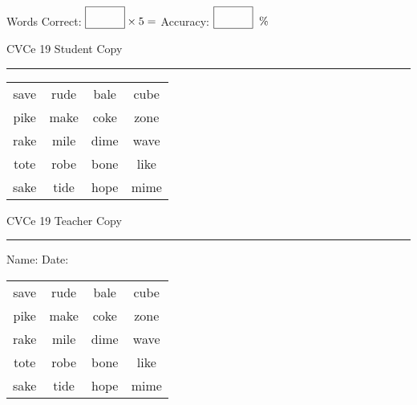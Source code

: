 \documentclass{memoir}
\begin{document}
\small

Words Correct: $\fbox{\phantom{\huge 100}} \times 5 = $ Accuracy: $\fbox{\phantom{\huge 100}}\;\; \%$ 

\vfill

\newpage


\footnotesize \noindent
CVCe 19 \hfill Student Copy
\smallskip
\hrule

\Large

\setlength{\tabcolsep}{14pt}
\def\arraystretch{2}

{\selectfont


\begin{vplace}[0.5]
\begin{center}
\begin{tabular}{cccc}
save & rude & bale & cube \\
pike & make & coke & zone \\
rake & mile & dime & wave \\
tote & robe & bone & like \\
sake & tide & hope & mime \\
\end{tabular}
\end{center}
\end{vplace}

}

\newpage

\footnotesize \noindent
CVCe 19 \hfill Teacher Copy
\smallskip
\hrule

\small

\vfill

\noindent
Name: \underline{\hspace{1.75in}} \hfill Date: \underline{\hspace{1in}}

\Large

{\selectfont


\begin{vplace}[0.5]
\begin{center}
\begin{tabular}{cccc}
save & rude & bale & cube \\
pike & make & coke & zone \\
rake & mile & dime & wave \\
tote & robe & bone & like \\
sake & tide & hope & mime \\
\end{tabular}
\end{center}
\end{vplace}



}
\end{document}
